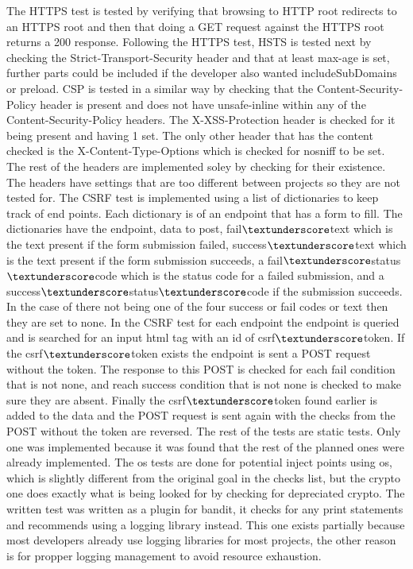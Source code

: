 The HTTPS test is tested by verifying that browsing to HTTP root redirects to an HTTPS root and then that doing a GET request against the HTTPS root returns a 200 response. Following the HTTPS test,
HSTS is tested next by checking the Strict-Transport-Security header and that at least max-age is set, further parts could be included if the developer also wanted includeSubDomains or preload. CSP
is tested in a similar way by checking that the Content-Security-Policy header is present and does not have unsafe-inline within any of the Content-Security-Policy headers. The X-XSS-Protection header
is checked for it being present and having 1 set. The only other header that has the content checked is the X-Content-Type-Options which is checked for nosniff to be set. The rest of the headers
are implemented soley by checking for their existence. The headers have settings that are too different between projects so they are not tested for. The CSRF test is implemented using a list of
dictionaries to keep track of end points. Each dictionary is of an endpoint that has a form to fill. The dictionaries have the endpoint, data to post, fail$\textunderscore$text which is the text
present if the form submission failed, success$\textunderscore$text which is the text present if the form submission succeeds, a fail$\textunderscore$status$\textunderscore$code which is the status
code for a failed submission, and a success$\textunderscore$status$\textunderscore$code if the submission succeeds. In the case of there not being one of the four success or fail codes or text then
they are set to none. In the CSRF test for each endpoint the endpoint is queried and is searched for an input html tag with an id of csrf$\textunderscore$token. If the csrf$\textunderscore$token
exists the endpoint is sent a POST request without the token. The response to this POST is checked for each fail condition that is not none, and reach success condition that is not none is checked 
to make sure they are absent. Finally the csrf$\textunderscore$token found earlier is added to the data and the POST request is sent again with the checks from the POST without the token are 
reversed. The rest of the tests are static tests. Only one was implemented because it was found that the rest of the planned ones were already implemented. The os tests are done for potential inject 
points using os, which is slightly different from the original goal in the checks list, but the crypto one does exactly what is being looked for by checking for depreciated crypto. The written test 
was written as a plugin for bandit, it checks for any print statements and recommends using a logging library instead. This one exists partially because most developers already use logging libraries 
for most projects, the other reason is for propper logging management to avoid resource exhaustion.


